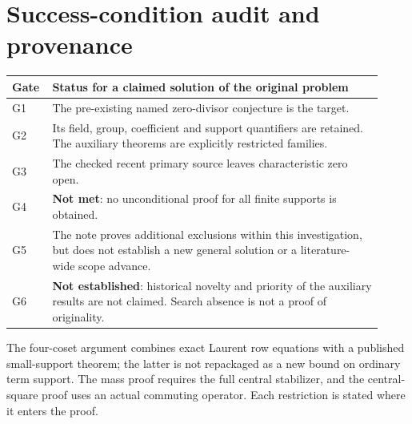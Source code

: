 \documentclass[11pt,a4paper,oneside]{report}
\theoremstyle{definition}
\theoremstyle{remark}
\begin{document}
\section{Success-condition audit and provenance}
\begin{center}
\begin{tabular}{@{}p{0.08\linewidth}p{0.84\linewidth}@{}}
\toprule
Gate & Status for a claimed solution of the original problem\\
\midrule
G1 & The pre-existing named zero-divisor conjecture is the target.\\
G2 & Its field, group, coefficient and support quantifiers are retained. The auxiliary theorems are explicitly restricted families.\\
G3 & The checked recent primary source leaves characteristic zero open.\\
G4 & \textbf{Not met}: no unconditional proof for all finite supports is obtained.\\
G5 & The note proves additional exclusions within this investigation, but does not establish a new general solution or a literature-wide scope advance.\\
G6 & \textbf{Not established}: historical novelty and priority of the auxiliary results are not claimed. Search absence is not a proof of originality.\\
\bottomrule
\end{tabular}
\end{center}
The four-coset argument combines exact Laurent row equations with
a published small-support theorem; the latter is not repackaged
as a new bound on ordinary term support. The mass proof requires
the full central stabilizer, and the central-square proof uses
an actual commuting operator. Each restriction is stated where
it enters the proof.

\clearpage
\end{document}
